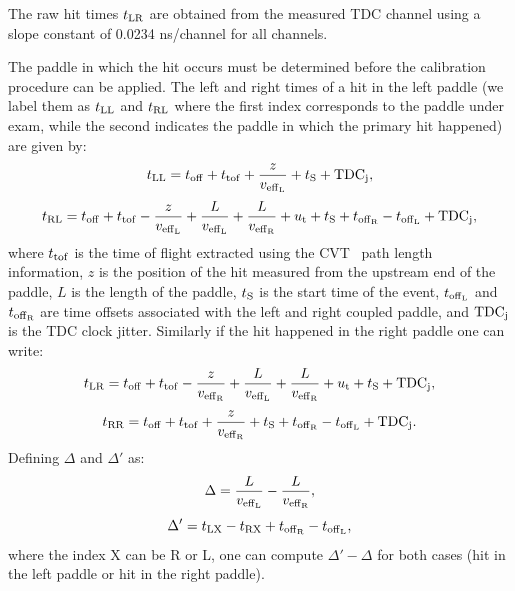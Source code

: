 The raw hit times $t_{\rm{LR}}$ are obtained from the measured TDC channel using a slope constant of 0.0234 ns/channel for all channels.

The paddle in which the hit occurs must be determined before the calibration procedure can be applied.
The left and right times of a hit in the left paddle (we label them as $t_{\rm{LL}}$ and $t_{\rm{RL}}$ where the first index corresponds to the paddle under exam, while the second indicates the paddle in which the primary hit happened) are given by:
\begin{equation}\label{eq_t_LL}
t_{{\rm{LL}}}=t_{\rm{off}}+t_{\rm{tof}}+\frac{z}{v_{\rm{eff}_L}}+t_{\rm{S}}+{\rm{TDC}}_{\rm{j}},
\end{equation}
\begin{equation}\label{eq_t_RL}
t_{{\rm{RL}}}=t_{\rm{off}}+t_{\rm{tof}}-\frac{z}{v_{\rm{eff}_L}}+\frac{L}{v_{\rm{eff}_L}}+\frac{L}{v_{\rm{eff}_{\rm{R}}}}+u_{\rm{t}}+t_{\rm{S}}+t_{\rm{off}_{\rm{R}}}-t_{\rm{off}_{\rm{L}}}+{\rm{TDC}}_{\rm{j}},
\end{equation}
where $t_{\rm{tof}}$ is the time of flight extracted using the CVT~\cite{svt-nim,mm-nim} path length information, $z$ is the position of the hit measured from the upstream end of the paddle, $L$ is the length of the paddle, $t_{\rm{S}}$ is the start time of the event, $t_{\rm{off}_{\rm{L}}}$ and $t_{\rm{off}_{\rm{R}}}$ are time offsets associated with the left and right coupled paddle, and ${\rm{TDC}}_{\rm{j}}$ is the TDC clock jitter.
Similarly if the hit happened in the right paddle one can write:
\begin{equation}\label{eq_time_hit_lr}
t_{{\rm{LR}}}=t_{\rm{off}}+t_{\rm{tof}}-\frac{z}{v_{\rm{eff}_{\rm{R}}}}+\frac{L}{v_{\rm{eff}_L}}+\frac{L}{v_{\rm{eff}_{\rm{R}}}}+u_{\rm{t}}+t_{\rm{S}}+{\rm{TDC}}_{\rm{j}},
\end{equation}
\begin{equation}\label{eq_time_hit_rr}
t_{\rm{RR}}=t_{\rm{off}}+t_{\rm{tof}}+\frac{z}{v_{\rm{eff}_{\rm{R}}}}+t_{\rm{S}}+t_{\rm{off}_{\rm{R}}}-t_{\rm{off}_{\rm{L}}}+{\rm{TDC}}_{\rm{j}}.
\end{equation}
Defining $\Delta$ and $\Delta'$ as:
\begin{equation}
\Delta=\frac{L}{v_{\rm{eff}_L}}-\frac{L}{v_{\rm{eff}_{\rm{R}}}},
\end{equation}
\begin{equation}
\Delta'=t_{\rm{LX}}-t_{\rm{RX}}+t_{\rm{off}_{\rm{R}}}-t_{\rm{off}_{\rm{L}}},
\end{equation}
where the index X can be R or L, one can compute $\Delta'-\Delta$ for both cases (hit in the left paddle or hit in the right paddle).

